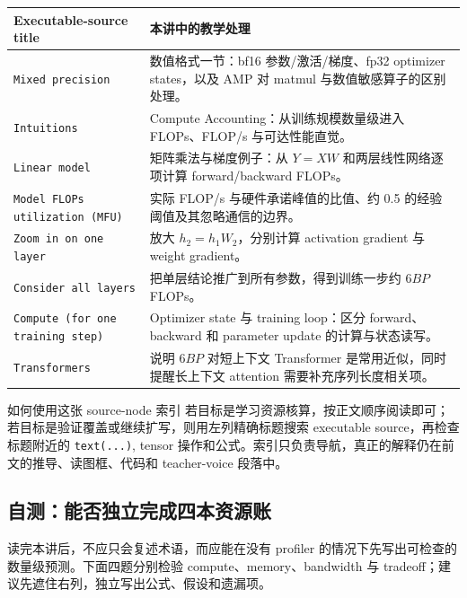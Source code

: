 \begin{longtable}{p{}p{}}
\toprule
\textbf{Executable-source title} & \textbf{本讲中的教学处理} \\
\midrule
\texttt{Mixed precision} & 数值格式一节：bf16 参数/激活/梯度、fp32 optimizer states，以及 AMP 对 matmul 与数值敏感算子的区别处理。 \\
\texttt{Intuitions} & Compute Accounting：从训练规模数量级进入 FLOPs、FLOP/s 与可达性能直觉。 \\
\texttt{Linear model} & 矩阵乘法与梯度例子：从 \(Y=XW\) 和两层线性网络逐项计算 forward/backward FLOPs。 \\
\texttt{Model FLOPs utilization (MFU)} & 实际 FLOP/s 与硬件承诺峰值的比值、约 0.5 的经验阈值及其忽略通信的边界。 \\
\texttt{Zoom in on one layer} & 放大 \(h_2=h_1W_2\)，分别计算 activation gradient 与 weight gradient。 \\
\texttt{Consider all layers} & 把单层结论推广到所有参数，得到训练一步约 \(6BP\) FLOPs。 \\
\texttt{Compute (for one training step)} & Optimizer state 与 training loop：区分 forward、backward 和 parameter update 的计算与状态读写。 \\
\texttt{Transformers} & 说明 \(6BP\) 对短上下文 Transformer 是常用近似，同时提醒长上下文 attention 需要补充序列长度相关项。 \\
\bottomrule
\end{longtable}

\begin{knowledgebox}{如何使用这张 source-node 索引}
若目标是学习资源核算，按正文顺序阅读即可；若目标是验证覆盖或继续扩写，则用左列精确标题搜索 executable source，再检查标题附近的 \texttt{text(...)}, tensor 操作和公式。索引只负责导航，真正的解释仍在前文的推导、读图框、代码和 teacher-voice 段落中。
\end{knowledgebox}

\subsection{自测：能否独立完成四本资源账}

读完本讲后，不应只会复述术语，而应能在没有 profiler 的情况下先写出可检查的数量级预测。下面四题分别检验 compute、memory、bandwidth 与 tradeoff；建议先遮住右列，独立写出公式、假设和遗漏项。

